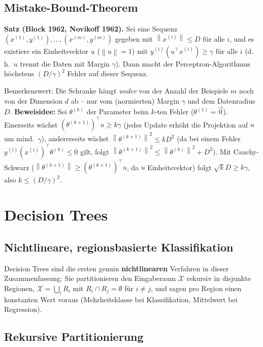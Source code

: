 \documentclass[11pt]{article}
\theoremstyle{csthm}
\theoremstyle{csdef}
\newcommand{\X}{\mathcal{X}}
\newcommand{\norm}[1]{\left\|#1\right\|}
\newcommand{\T}{^\top}
\begin{document}
\subsection{Mistake-Bound-Theorem}

\begin{tcolorbox}[thmstyle]
\textbf{Satz (Block 1962, Novikoff 1962).}
Sei eine Sequenz $(x^{(1)},y^{(1)}),\ldots,(x^{(m)},y^{(m)})$ gegeben mit
$\norm{x^{(i)}} \leq D$ für alle $i$, und es existiere ein Einheitsvektor $u$
($\norm{u}=1$) mit $y^{(i)}(u\T x^{(i)}) \geq \gamma$ für alle $i$ (d.\,h.\
$u$ trennt die Daten mit Margin $\gamma$). Dann macht der
Perceptron-Algorithmus höchstens $(D/\gamma)^2$ Fehler auf dieser Sequenz.
\end{tcolorbox}

Bemerkenswert: Die Schranke hängt \emph{weder} von der Anzahl der Beispiele
$m$ noch von der Dimension $d$ ab -- nur vom (normierten) Margin $\gamma$ und
dem Datenradius $D$. \textbf{Beweisidee:} Sei $\theta^{(k)}$ der Parameter
beim $k$-ten Fehler ($\theta^{(1)}=\vec 0$). Einerseits wächst
$(\theta^{(k+1)})\T u \geq k\gamma$ (jedes Update erhöht die Projektion auf
$u$ um mind.\ $\gamma$), andererseits wächst $\norm{\theta^{(k+1)}}^2 \leq
kD^2$ (da bei einem Fehler $y^{(i)}(x^{(i)})\T\theta^{(k)} \leq 0$ gilt, folgt
$\norm{\theta^{(k+1)}}^2 \leq \norm{\theta^{(k)}}^2 + D^2$). Mit
Cauchy-Schwarz ($\norm{\theta^{(k+1)}}\geq(\theta^{(k+1)})\T u$, da $u$
Einheitsvektor) folgt $\sqrt{k}D \geq k\gamma$, also $k \leq (D/\gamma)^2$.

\section{Decision Trees}

\subsection{Nichtlineare, regionsbasierte Klassifikation}

Decision Trees sind die ersten genuin \textbf{nichtlinearen} Verfahren in
dieser Zusammenfassung: Sie partitionieren den Eingaberaum $\X$ rekursiv in
disjunkte Regionen, $\X = \bigcup_i R_i$ mit $R_i \cap R_j = \emptyset$ für
$i\neq j$, und sagen pro Region einen konstanten Wert voraus (Mehrheitsklasse
bei Klassifikation, Mittelwert bei Regression).

\subsection{Rekursive Partitionierung}
\end{document}
